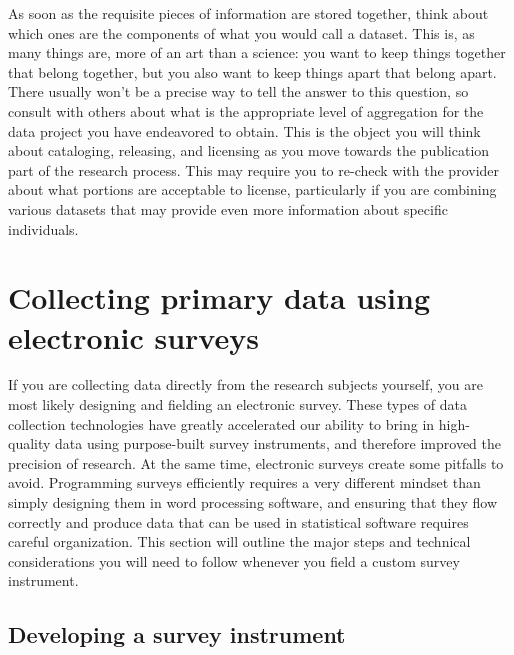As soon as the requisite pieces of information are stored together,
think about which ones are the components of what you would call a dataset.
This is, as many things are, more of an art than a science:
you want to keep things together that belong together,
but you also want to keep things apart that belong apart.
There usually won't be a precise way to tell the answer to this question,
so consult with others about what is the appropriate level of aggregation
for the data project you have endeavored to obtain.
This is the object you will think about cataloging, releasing, and licensing
as you move towards the publication part of the research process.
This may require you to re-check with the provider
about what portions are acceptable to license,
particularly if you are combining various datasets
that may provide even more information about specific individuals.

\section{Collecting primary data using electronic surveys}

If you are collecting data directly from the research subjects yourself,
you are most likely designing and fielding an electronic survey.
These types of data collection technologies
have greatly accelerated our ability to bring in high-quality data
using purpose-built survey instruments,
and therefore improved the precision of research.
At the same time, electronic surveys create some pitfalls to avoid.
Programming surveys efficiently requires a very different mindset
than simply designing them in word processing software,
and ensuring that they flow correctly and produce data
that can be used in statistical software requires careful organization.
This section will outline the major steps and technical considerations
you will need to follow whenever you field a custom survey instrument.

\subsection{Developing a survey instrument}

